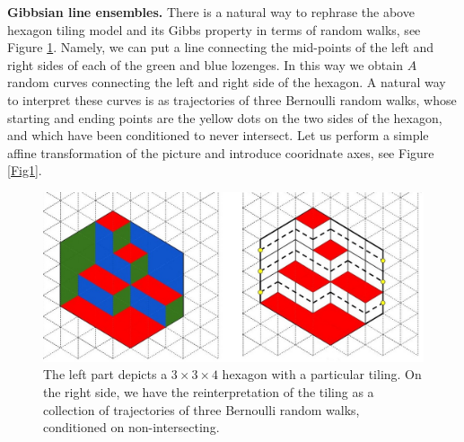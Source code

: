 \documentclass[a4paper, 11pt]{amsart}
\begin{document}
{\raggedleft \bf Gibbsian line ensembles.} There is a natural way to rephrase the above hexagon tiling model and its Gibbs property in terms of random walks, see Figure \ref{S1_2}. Namely, we can put a line connecting the mid-points of the left and right sides of each of the green and blue lozenges. In this way we obtain $A$ random curves connecting the left and right side of the hexagon. A natural way to interpret these curves is as trajectories of three Bernoulli random walks, whose starting and ending points are the yellow dots on the two sides of the hexagon, and which have been conditioned to never intersect. Let us perform a simple affine transformation of the picture and introduce cooridnate axes, see Figure \ref{Fig1}.  
\begin{figure}[h]
\begin{center}
  \includegraphics[scale = 0.40]{S_1.jpg}
  \vspace{-2mm}
  \caption{ The left part depicts a $3 \times 3 \times 4$ hexagon with a particular tiling. On the right side, we have the reinterpretation of the tiling as a collection of trajectories of three Bernoulli random walks, conditioned on non-intersecting. }
  \label{S1_2}
  \end{center}
\end{figure}
\end{document}
